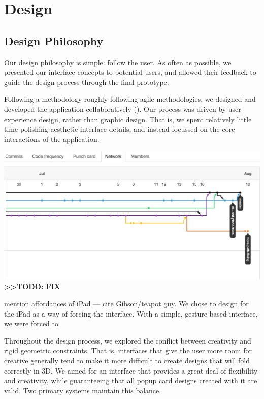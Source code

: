 \chapter{Design}

\section{Design Philosophy}\label{design-philosophy}

Our design philosophy is simple: follow the user. As often as possible,
we presented our interface concepts to potential users, and allowed
their feedback to guide the design process through the final prototype.

Following a methodology roughly following agile methodologies, we
designed and developed the application collaboratively
(\citet{martin2003agile}). Our process was driven by user experience
design, rather than graphic design. That is, we spent relatively little
time polishing aesthetic interface details, and instead focussed on the
core interactions of the application.

\includegraphics{figures/30_UI_Design_Philosophy/gitflow.png}
\textbf{\textgreater{}\textgreater{}TODO: FIX}

mention affordances of iPad --- cite Gibson/teapot guy. We chose to
design for the iPad as a way of forcing the interface. With a simple,
gesture-based interface, we were forced to

Throughout the design process, we explored the conflict between
creativity and rigid geometric constraints. That is, interfaces that
give the user more room for creative generally tend to make it more
difficult to create designs that will fold correctly in 3D. We aimed for
an interface that provides a great deal of flexibility and creativity,
while guaranteeing that all popup card designs created with it are
valid. Two primary systems maintain this balance.

